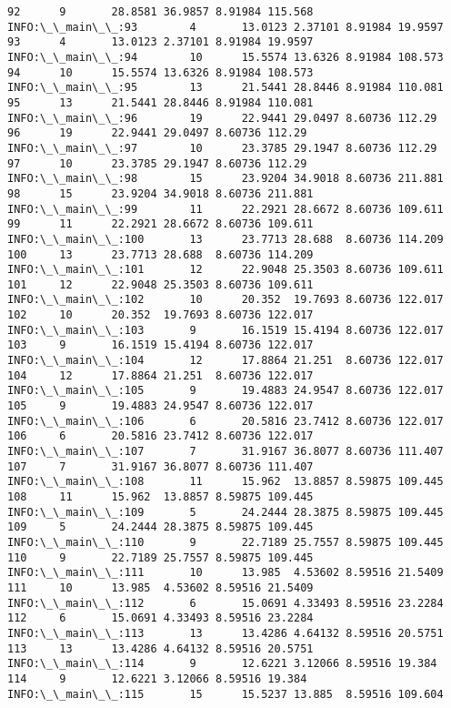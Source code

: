 \documentclass[11pt]{article}
\begin{document}
\begin{Verbatim}[commandchars=\\\{\}]
92      9       28.8581 36.9857 8.91984 115.568
INFO:\_\_main\_\_:93        4       13.0123 2.37101 8.91984 19.9597
93      4       13.0123 2.37101 8.91984 19.9597
INFO:\_\_main\_\_:94        10      15.5574 13.6326 8.91984 108.573
94      10      15.5574 13.6326 8.91984 108.573
INFO:\_\_main\_\_:95        13      21.5441 28.8446 8.91984 110.081
95      13      21.5441 28.8446 8.91984 110.081
INFO:\_\_main\_\_:96        19      22.9441 29.0497 8.60736 112.29
96      19      22.9441 29.0497 8.60736 112.29
INFO:\_\_main\_\_:97        10      23.3785 29.1947 8.60736 112.29
97      10      23.3785 29.1947 8.60736 112.29
INFO:\_\_main\_\_:98        15      23.9204 34.9018 8.60736 211.881
98      15      23.9204 34.9018 8.60736 211.881
INFO:\_\_main\_\_:99        11      22.2921 28.6672 8.60736 109.611
99      11      22.2921 28.6672 8.60736 109.611
INFO:\_\_main\_\_:100       13      23.7713 28.688  8.60736 114.209
100     13      23.7713 28.688  8.60736 114.209
INFO:\_\_main\_\_:101       12      22.9048 25.3503 8.60736 109.611
101     12      22.9048 25.3503 8.60736 109.611
INFO:\_\_main\_\_:102       10      20.352  19.7693 8.60736 122.017
102     10      20.352  19.7693 8.60736 122.017
INFO:\_\_main\_\_:103       9       16.1519 15.4194 8.60736 122.017
103     9       16.1519 15.4194 8.60736 122.017
INFO:\_\_main\_\_:104       12      17.8864 21.251  8.60736 122.017
104     12      17.8864 21.251  8.60736 122.017
INFO:\_\_main\_\_:105       9       19.4883 24.9547 8.60736 122.017
105     9       19.4883 24.9547 8.60736 122.017
INFO:\_\_main\_\_:106       6       20.5816 23.7412 8.60736 122.017
106     6       20.5816 23.7412 8.60736 122.017
INFO:\_\_main\_\_:107       7       31.9167 36.8077 8.60736 111.407
107     7       31.9167 36.8077 8.60736 111.407
INFO:\_\_main\_\_:108       11      15.962  13.8857 8.59875 109.445
108     11      15.962  13.8857 8.59875 109.445
INFO:\_\_main\_\_:109       5       24.2444 28.3875 8.59875 109.445
109     5       24.2444 28.3875 8.59875 109.445
INFO:\_\_main\_\_:110       9       22.7189 25.7557 8.59875 109.445
110     9       22.7189 25.7557 8.59875 109.445
INFO:\_\_main\_\_:111       10      13.985  4.53602 8.59516 21.5409
111     10      13.985  4.53602 8.59516 21.5409
INFO:\_\_main\_\_:112       6       15.0691 4.33493 8.59516 23.2284
112     6       15.0691 4.33493 8.59516 23.2284
INFO:\_\_main\_\_:113       13      13.4286 4.64132 8.59516 20.5751
113     13      13.4286 4.64132 8.59516 20.5751
INFO:\_\_main\_\_:114       9       12.6221 3.12066 8.59516 19.384
114     9       12.6221 3.12066 8.59516 19.384
INFO:\_\_main\_\_:115       15      15.5237 13.885  8.59516 109.604

\end{Verbatim}
\end{document}
